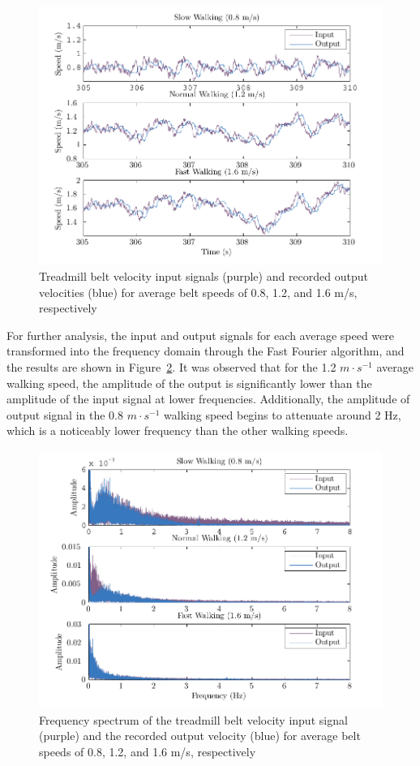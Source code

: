 \documentclass[10pt,a4paper,twocolumn]{article}
\begin{document}
\begin{figure}
  \includegraphics{figures/input_vs_output.pdf}
  \caption{Treadmill belt velocity input signals (purple) and recorded output
    velocities (blue) for average belt speeds of 0.8, 1.2, and 1.6 m/s,
    respectively}
  \label{fig:input_output}
\end{figure}

For further analysis, the input and output signals for each average speed were
transformed into the frequency domain through the Fast Fourier algorithm, and
the results are shown in Figure~\ref{fig:freq_analysis}. It was observed that
for the 1.2 $m \cdot s^{-1}$ average walking speed, the amplitude of the output
is significantly lower than the amplitude of the input signal at lower
frequencies. Additionally, the amplitude of output signal in the 0.8 $m \cdot
s^{-1}$ walking speed begins to attenuate around 2 Hz, which is a noticeably
lower frequency than the other walking speeds.

\begin{figure}
  \includegraphics{figures/frequency_analysis.pdf}
  \caption{Frequency spectrum of the treadmill belt velocity input signal
    (purple) and the recorded output velocity (blue) for average belt speeds of
    0.8, 1.2, and 1.6 m/s, respectively}
  \label{fig:freq_analysis}
\end{figure}
\end{document}

